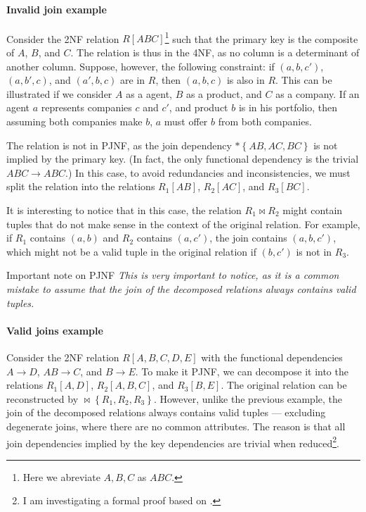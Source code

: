 \paragraph{Invalid join example} Consider the 2NF relation $R[ABC]$\footnote{Here we abreviate ${A,
B, C}$ as $ABC$.} such that the primary key is the composite of $A$, $B$, and $C$.  The
relation is thus in the 4NF, as no column is a determinant of another column.  Suppose,
however, the following constraint: if $(a, b, c')$, $(a, b', c)$, and $(a', b, c)$ are in
$R$, then $(a, b, c)$ is also in $R$.  This can be illustrated if we consider $A$ as a
agent, $B$ as a product, and $C$ as a company.  If an agent $a$ represents companies $c$ and
$c'$, and product $b$ is in his portfolio, then assuming both companies make $b$, $a$
must offer $b$ from both companies.

The relation is not in PJNF, as the join dependency $* \left\{ AB, AC, BC \right\}$ is not
implied by the primary key.  (In fact, the only functional dependency is the trivial $ABC
\to ABC$.)  In this case, to avoid redundancies and inconsistencies, we must split the
relation into the relations $R_1[AB]$, $R_2[AC]$, and $R_3[BC]$.

It is interesting to notice that in this case, the relation $R_1 \bowtie R_2$ might
contain tuples that do not make sense in the context of the original relation.  For
example, if $R_1$ contains $(a, b)$ and $R_2$ contains $(a, c')$, the join contains
$(a, b, c')$, which might not be a valid tuple in the original relation if $(b, c')$ is
not in $R_3$.

\begin{hlbox}{Important note on PJNF}
  \em
  This is very important to notice, as it is a common mistake to assume
  that the join of the decomposed relations always contains valid tuples.
\end{hlbox}

\paragraph{Valid joins example}  Consider the 2NF relation $R[A, B, C, D, E]$ with the functional
dependencies $A \to D$, $AB \to C$, and $B \to E$.  To make it PJNF, we can decompose it
into the relations $R_1[A, D]$, $R_2[A, B, C]$, and $R_3[B, E]$.  The original relation can
be reconstructed by $\bowtie \left\{ R_1, R_2, R_3 \right\}$.  However, unlike the
previous example, the join of the decomposed relations always contains valid tuples
--- excluding degenerate joins, where there are no common attributes.
The reason is that all join dependencies implied by the key dependencies are trivial when
reduced\footnote{I am investigating a formal proof based on .}.

